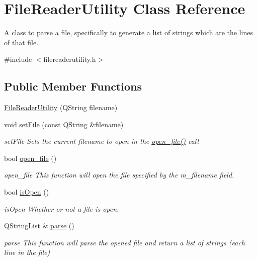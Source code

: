 \hypertarget{classFileReaderUtility}{\section{File\-Reader\-Utility Class Reference}
\label{classFileReaderUtility}
}


A class to parse a file, specifically to generate a list of strings which are the lines of that file.  




{\ttfamily \#include $<$filereaderutility.\-h$>$}

\subsection*{Public Member Functions}
\begin{DoxyCompactItemize}
\item 
\hyperlink{classFileReaderUtility_a470ee17457de07fe519aaf8e607a82bc}{File\-Reader\-Utility} (Q\-String filename)
\item 
void \hyperlink{classFileReaderUtility_a8d4984a9b7f18c589906d6e26956402b}{set\-File} (const Q\-String \&filename)
\begin{DoxyCompactList}\small\item\em set\-File Sets the current filename to open in the \hyperlink{classFileReaderUtility_a77c879620e0ddcc16e966649a73aa5c5}{open\-\_\-file()} call \end{DoxyCompactList}\item 
bool \hyperlink{classFileReaderUtility_a77c879620e0ddcc16e966649a73aa5c5}{open\-\_\-file} ()
\begin{DoxyCompactList}\small\item\em open\-\_\-file This function will open the file specified by the m\-\_\-filename field. \end{DoxyCompactList}\item 
bool \hyperlink{classFileReaderUtility_a0e8f0a86678ed4690758abad92d08520}{is\-Open} ()
\begin{DoxyCompactList}\small\item\em is\-Open Whether or not a file is open. \end{DoxyCompactList}\item 
Q\-String\-List \& \hyperlink{classFileReaderUtility_af0efa92dc11188682345ba1d587993a7}{parse} ()
\begin{DoxyCompactList}\small\item\em parse This function will parse the opened file and return a list of strings (each line in the file) \end{DoxyCompactList}\end{DoxyCompactItemize}


